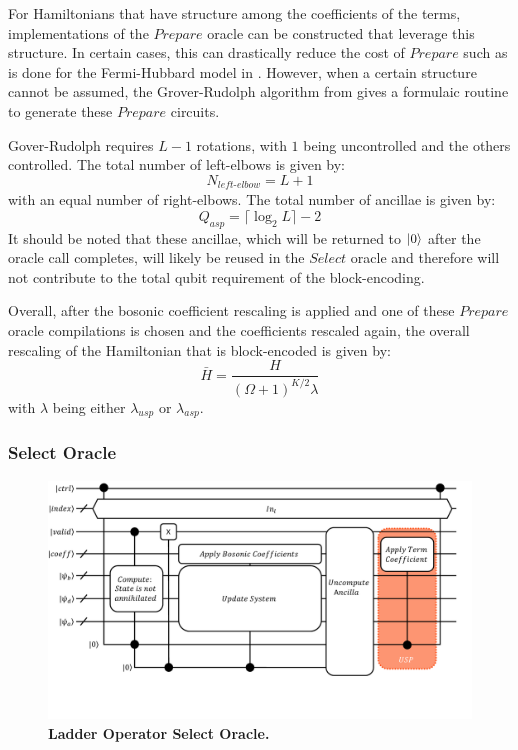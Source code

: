 For Hamiltonians that have structure among the coefficients of the terms, implementations of the $\textit{Prepare}$ oracle can be constructed that leverage this structure.
In certain cases, this can drastically reduce the cost of $\textit{Prepare}$ such as is done for the Fermi-Hubbard model in \cite{babbush2018encoding}.
However, when a certain structure cannot be assumed, the Grover-Rudolph algorithm from \cite{grover2002creating} gives a formulaic routine to generate these $\textit{Prepare}$ circuits.

Gover-Rudolph requires $L-1$ rotations, with $1$ being uncontrolled and the others controlled.
The total number of left-elbows is given by:
\begin{equation}
    N_{\textit{left-elbow}} = L + 1 
\end{equation}
with an equal number of right-elbows.
The total number of ancillae is given by:
\begin{equation}
    Q_{asp} = \lceil \log_2{L} \rceil - 2
\end{equation}
It should be noted that these ancillae, which will be returned to $\ket{0}$ after the oracle call completes, will likely be reused in the $\textit{Select}$ oracle and therefore will not contribute to the total qubit requirement of the block-encoding.

Overall, after the bosonic coefficient rescaling is applied and one of these $Prepare$ oracle compilations is chosen and the coefficients rescaled again, the overall rescaling of the Hamiltonian that is block-encoded is given by:
\begin{equation}
    \bar{H} = \frac{H}{(\Omega + 1)^{K/2} \lambda}
\end{equation}
with $\lambda$ being either $\lambda_{usp}$ or $\lambda_{asp}$.

\subsubsection{Select Oracle}
\label{subsubsec:select}

\begin{figure}
    \centering
    \includegraphics[width=16cm]{figures/select-broad.pdf}
    \caption{\textbf{Ladder Operator Select Oracle.}
    }
    \label{fig:select-broad}
\end{figure}

